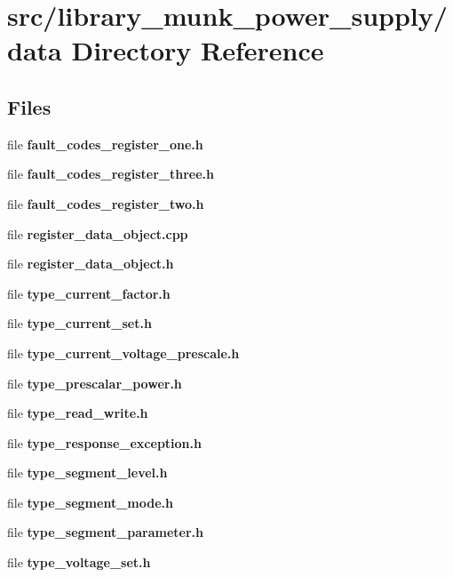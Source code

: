 \section{src/library\+\_\+munk\+\_\+power\+\_\+supply/data Directory Reference}
\label{dir_b953ff29f56f4239e8e99d378b46f8ff}
\subsection*{Files}
\begin{DoxyCompactItemize}
\item 
file \textbf{ fault\+\_\+codes\+\_\+register\+\_\+one.\+h}
\item 
file \textbf{ fault\+\_\+codes\+\_\+register\+\_\+three.\+h}
\item 
file \textbf{ fault\+\_\+codes\+\_\+register\+\_\+two.\+h}
\item 
file \textbf{ register\+\_\+data\+\_\+object.\+cpp}
\item 
file \textbf{ register\+\_\+data\+\_\+object.\+h}
\item 
file \textbf{ type\+\_\+current\+\_\+factor.\+h}
\item 
file \textbf{ type\+\_\+current\+\_\+set.\+h}
\item 
file \textbf{ type\+\_\+current\+\_\+voltage\+\_\+prescale.\+h}
\item 
file \textbf{ type\+\_\+prescalar\+\_\+power.\+h}
\item 
file \textbf{ type\+\_\+read\+\_\+write.\+h}
\item 
file \textbf{ type\+\_\+response\+\_\+exception.\+h}
\item 
file \textbf{ type\+\_\+segment\+\_\+level.\+h}
\item 
file \textbf{ type\+\_\+segment\+\_\+mode.\+h}
\item 
file \textbf{ type\+\_\+segment\+\_\+parameter.\+h}
\item 
file \textbf{ type\+\_\+voltage\+\_\+set.\+h}
\end{DoxyCompactItemize}
